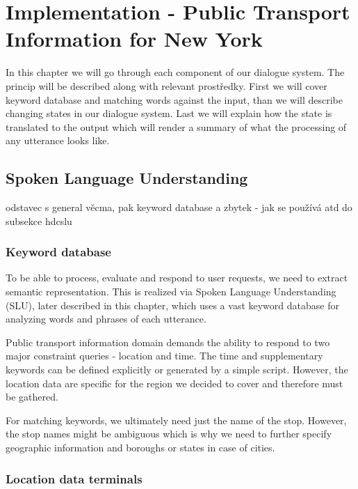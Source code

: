 \chapter{Implementation - Public Transport Information for New York}

In this chapter we will go through each component of our dialogue system.
The princip will be described along with relevant prostředky.
First we will cover keyword database and matching words against the input, than we will describe changing states in our dialogue system.
Last we will explain how the state is translated to the output which will render a summary of what the processing of any utterance looks like.

\section{Spoken Language Understanding}

odstavec s general věcma, pak keyword database a zbytek - jak se používá atd do subsekce hdcslu

\subsection{Keyword database} 

To be able to process, evaluate and respond to user requests, we need to extract semantic representation.
This is realized via Spoken Language Understanding (SLU), later described in this chapter, which uses a vast keyword database for analyzing words and phrases of each utterance.

Public transport information domain demands the ability to respond to two major constraint queries - location and time.
The time and supplementary keywords can be defined explicitly or generated by a simple script.
However, the location data are specific for the region we decided to cover and therefore must be gathered.

For matching keywords, we ultimately need just the name of the stop. 
However, the stop names might be ambiguous which is why we need to further specify geographic information and boroughs or states in case of cities. 

\subsection{Location data terminals} \label{sec:terminals}

